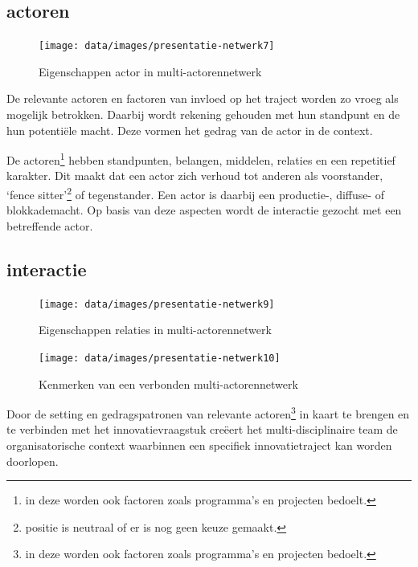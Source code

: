 \documentclass[
]{book}
\begin{document}
\hypertarget{actoren-1}{%
\subsection{actoren}\label{actoren-1}}

\begin{figure}

{\centering \texttt{[image: data/images/presentatie-netwerk7]} 

}

\caption{Eigenschappen actor in multi-actorennetwerk}\label{fig:actoren}
\end{figure}

De relevante actoren en factoren van invloed op het traject worden zo vroeg als mogelijk betrokken. Daarbij wordt rekening gehouden met hun standpunt en de hun potentiële macht. Deze vormen het gedrag van de actor in de context.

De actoren\footnote{in deze worden ook factoren zoals programma's en projecten bedoelt.} hebben standpunten, belangen, middelen, relaties en een repetitief karakter. Dit maakt dat een actor zich verhoud tot anderen als voorstander, `fence sitter'\footnote{positie is neutraal of er is nog geen keuze gemaakt.} of tegenstander. Een actor is daarbij een productie-, diffuse- of blokkademacht. Op basis van deze aspecten wordt de interactie gezocht met een betreffende actor.

\hypertarget{interactie}{%
\subsection{interactie}\label{interactie}}

\begin{figure}

{\centering \texttt{[image: data/images/presentatie-netwerk9]} 

}

\caption{Eigenschappen relaties in multi-actorennetwerk}\label{fig:relaties}
\end{figure}
\begin{figure}

{\centering \texttt{[image: data/images/presentatie-netwerk10]} 

}

\caption{Kenmerken van een verbonden multi-actorennetwerk}\label{fig:verbinding}
\end{figure}

Door de setting en gedragspatronen van relevante actoren\footnote{in deze worden ook factoren zoals programma's en projecten bedoelt.} in kaart te brengen en te verbinden met het innovatievraagstuk creëert het multi-disciplinaire team de organisatorische context waarbinnen een specifiek innovatietraject kan worden doorlopen.
\end{document}
